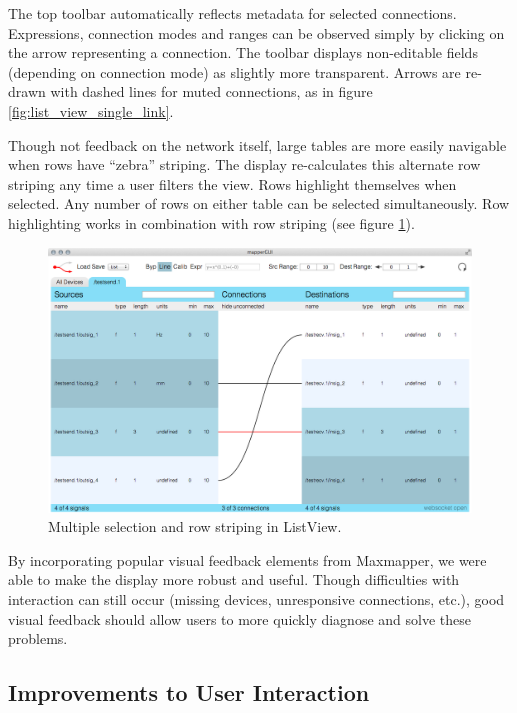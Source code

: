 The top toolbar automatically reflects metadata for selected connections. Expressions, connection modes and ranges can be observed simply by clicking on the arrow representing a connection. The toolbar displays non-editable fields (depending on connection mode) as slightly more transparent. Arrows are re-drawn with dashed lines for muted connections, as in figure \ref{fig:list_view_single_link}.

Though not feedback on the network itself, large tables are more easily navigable when rows have ``zebra'' striping. The display re-calculates this alternate row striping any time a user filters the view. Rows highlight themselves when selected. Any number of rows on either table can be selected simultaneously. Row highlighting works in combination with row striping (see figure \ref{fig:row_striping}).

\begin{figure}[!h]
	\centering
	\includegraphics[width=1\textwidth]{figures/row_striping}
	\caption{Multiple selection and row striping in ListView.}
	\label{fig:row_striping}
\end{figure}

By incorporating popular visual feedback elements from Maxmapper, we were able to make the display more robust and useful. Though difficulties with interaction can still occur (missing devices, unresponsive connections, etc.), good visual feedback should allow users to more quickly diagnose and solve these problems.


	\subsection{Improvements to User Interaction} %
	\label{sub:improvements_to_user_interaction}

